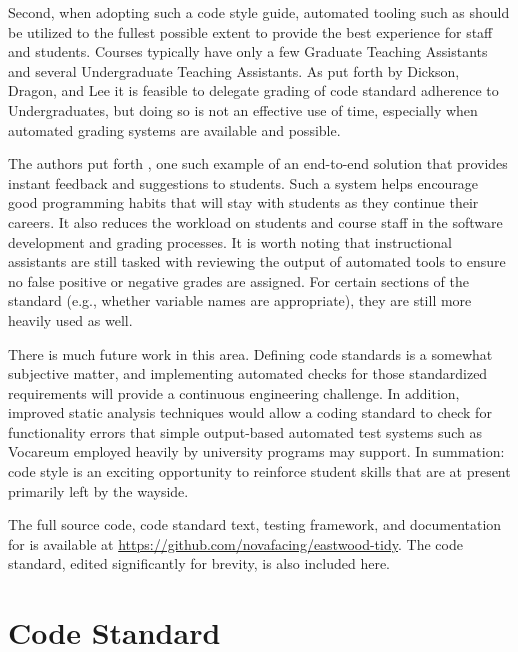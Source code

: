 \documentclass[sigconf]{acmart}
\begin{document}
Second, when adopting such a code style guide, automated tooling such as  \tool{} should be utilized to
the fullest possible extent to provide the best experience for staff and students.
Courses typically have only a few Graduate Teaching Assistants and several Undergraduate
Teaching Assistants. As put forth by Dickson, Dragon, and Lee \cite{10.1145/3017680.3017725} it is feasible to delegate grading of code standard
adherence to Undergraduates, but doing so is not an effective use of time,
especially when automated grading systems are available and possible.

The authors put forth \tool{}, one such example of an end-to-end solution that provides
instant feedback and suggestions to students. Such a system helps encourage good
programming habits that will stay with students as they continue their
careers. It also reduces the workload on students and course staff in the software
development and grading processes. It is worth noting that instructional assistants are still
tasked with reviewing the output of automated tools to ensure no false positive or
negative grades are assigned. For certain sections of the standard (e.g., whether variable names are appropriate), they are still more heavily used as well.

There is much future work in this area. Defining code standards
is a somewhat subjective matter, and implementing automated
checks for those standardized requirements will provide a continuous engineering challenge. In addition, improved static analysis techniques
would allow a coding standard to check for functionality errors that simple output-based automated test systems such as Vocareum employed heavily by university programs may support.
In summation: code style is an exciting opportunity to reinforce
student skills that are at present primarily left by the wayside.

The full source code, code standard text, testing framework, and documentation for \tool{} is available at \linebreak\href{https://github.com/novafacing/eastwood-tidy}{https://github.com/novafacing/eastwood-tidy}. The code standard, edited significantly for brevity, is also included here.


\section{Code Standard}
\end{document}
